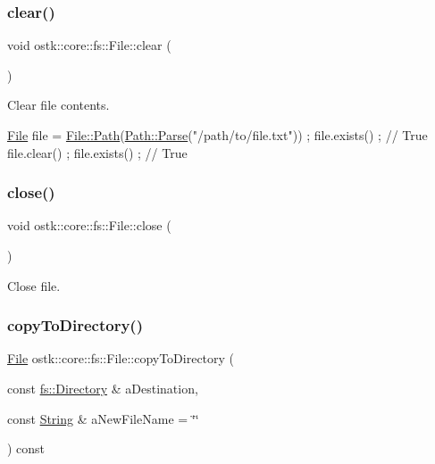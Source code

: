 \subsubsection{\texorpdfstring{clear()}{clear()}}
{\footnotesize\ttfamily void ostk\+::core\+::fs\+::\+File\+::clear (\begin{DoxyParamCaption}{ }\end{DoxyParamCaption})}



Clear file contents. 


\begin{DoxyCode}
\hyperlink{classostk_1_1core_1_1fs_1_1_file_ad1695224996950be9962b8457da369b3}{File} file = \hyperlink{classostk_1_1core_1_1fs_1_1_file_ad677c6a3edc1e88c18226edebff1da03}{File::Path}(\hyperlink{classostk_1_1core_1_1fs_1_1_path_ad08539ba654f5df11c4bcb07276345ad}{Path::Parse}(\textcolor{stringliteral}{"/path/to/file.txt"})) ;
file.exists() ; \textcolor{comment}{// True}
file.clear() ;
file.exists() ; \textcolor{comment}{// True}
\end{DoxyCode}
 \mbox{\label{classostk_1_1core_1_1fs_1_1_file_a1673393d876005d7eae90e435584ea38}} 
\subsubsection{\texorpdfstring{close()}{close()}}
{\footnotesize\ttfamily void ostk\+::core\+::fs\+::\+File\+::close (\begin{DoxyParamCaption}{ }\end{DoxyParamCaption})}



Close file. 

\mbox{\label{classostk_1_1core_1_1fs_1_1_file_aab6e069ef912f0ffe6203a9eb32a16d7}} 
\subsubsection{\texorpdfstring{copy\+To\+Directory()}{copyToDirectory()}}
{\footnotesize\ttfamily \hyperlink{classostk_1_1core_1_1fs_1_1_file}{File} ostk\+::core\+::fs\+::\+File\+::copy\+To\+Directory (\begin{DoxyParamCaption}\item[{const \hyperlink{classostk_1_1core_1_1fs_1_1_directory}{fs\+::\+Directory} \&}]{a\+Destination,  }\item[{const \hyperlink{classostk_1_1core_1_1types_1_1_string}{String} \&}]{a\+New\+File\+Name = {\ttfamily \char`\"{}\char`\"{}} }\end{DoxyParamCaption}) const}



